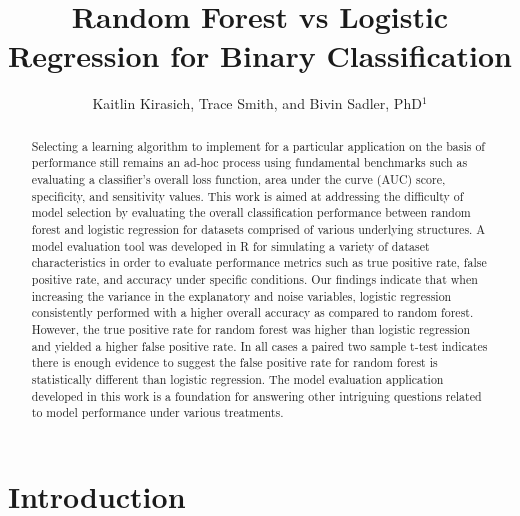\documentclass{llncs}
\title{\textbf{Random Forest vs Logistic Regression for Binary Classification}}
\author{Kaitlin Kirasich, Trace Smith, and Bivin Sadler, PhD$^1$}
\institute{$^1$Master of Science in Data Science \\ Southern Methodist University \\ Dallas, Texas USA \\
\email{kkirasich@.smu.edu,traces@smu.edu,bsadler@smu.edu}}
\begin{document}
\maketitle

\begin{abstract} 
Selecting a learning algorithm to implement for a particular application on the basis of performance still remains an ad-hoc process using fundamental benchmarks such as evaluating a classifier’s overall loss function, area under the curve (AUC) score, specificity, and sensitivity values. This work is aimed at addressing the difficulty of model selection by evaluating the overall classification performance between random forest and logistic regression for datasets comprised of various underlying structures. A model evaluation tool was developed in R for simulating a variety of dataset characteristics in order to evaluate performance metrics such as true positive rate, false positive rate, and accuracy under specific conditions. Our findings indicate that when increasing the variance in the explanatory and noise variables, logistic regression consistently performed with a higher overall accuracy as compared to random forest.  However, the true positive rate for random forest was higher than logistic regression and yielded a higher false positive rate. In all cases a paired two sample t-test indicates there is enough evidence to suggest the false positive rate for random forest is statistically different than logistic regression. The model evaluation application developed in this work is a foundation for answering other intriguing questions related to model performance under various treatments. 

\end{abstract}


\section{Introduction}
\end{document}
